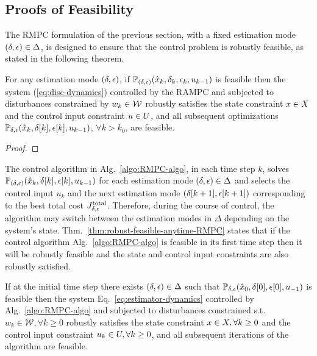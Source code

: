 \subsection{Proofs of Feasibility}
The RMPC formulation of the previous section, with a fixed estimation mode
$\left(\delta,\epsilon\right)\in\Delta$, is designed to ensure that the control problem is robustly feasible, as stated in the following theorem.
\begin{thm}
\label{thm:robust-feasible-RMPC} For
any estimation mode $\left(\delta,\epsilon\right)$, if $\mathbb{P}_{(\delta,\epsilon)}(\hat{x}_{k},\delta_{k},\epsilon_{k},u_{k -1})$
is feasible then the system (\ref{eq:disc-dynamics}) controlled by
the RAMPC and subjected to disturbances constrained by $w_k \in \mathcal{W}$
robustly satisfies the state constraint $x \in X$
and the control input constraint $u \in U$, and
all subsequent optimizations $\mathbb{P_{\delta,\epsilon}}(\hat{x}_{k},\delta[k],\epsilon[k],u_{k-1})$,
$\forall k>k_{0}$, are feasible.
\end{thm}
\begin{proof}

\end{proof}
The control algorithm in Alg.~\ref{algo:RMPC-algo}, in each time step $k$, solves $\mathbb{P_{(\delta,\epsilon)}}(\hat{x}_{k},\delta[k],\epsilon[k],u_{k-1})$ for each estimation mode $\left(\delta,\epsilon\right)\in\Delta$ and selects the control input $u_{k}$ and the next estimation mode $\left(\delta[k+1],\epsilon[k+1]\right)$
corresponding to the best total cost $J_{\delta,\epsilon}^{\mathrm{total}}$.
Therefore, during the course of control, the algorithm may switch between the estimation modes in $\Delta$ depending on the system's state. Thm.~\ref{thm:robust-feasible-anytime-RMPC} states that if the control algorithm Alg.~\ref{algo:RMPC-algo} is feasible in its first time step then it will be robustly feasible and the state and control input constraints are also robustly satisfied.
\begin{thm}%
\label{thm:robust-feasible-anytime-RMPC}
If at the initial time step there exists $\left(\delta,\epsilon\right)\in\Delta$
such that $\mathbb{P_{\delta,\epsilon}}(\hat{x}_{0},\delta[0],\epsilon[0],u_{-1})$
is feasible then the system Eq.~\ref{eq:estimator-dynamics} controlled by
Alg.~\ref{algo:RMPC-algo} and subjected to disturbances constrained
s.t. $w_k\in\mathcal{W},\forall k\geq0$ robustly satisfies the state constraint
$x\in X,\forall k\geq0$ and the control input constraint $u_k\in U,\forall k\geq0$,
and all subsequent iterations of the algorithm are feasible.
\end{thm}
